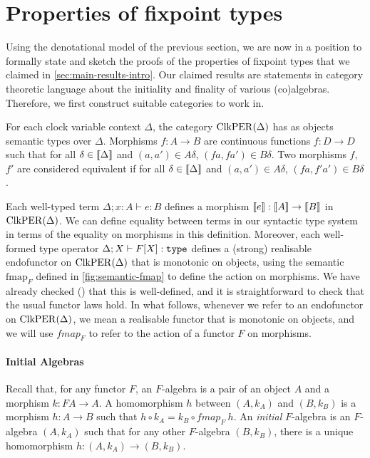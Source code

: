 \section{Properties of fixpoint types}
\label{sec:fixpoint-types}

Using the denotational model of the previous section, we are now in a
position to formally state and sketch the proofs of the properties of
fixpoint types that we claimed in
\autoref{sec:main-results-intro}. Our claimed results are statements
in category theoretic language about the initiality and finality of
various (co)algebras. Therefore, we first construct suitable
categories to work in.

\begin{definition}
  For each clock variable context $\Delta$, the category
  $\mathrm{ClkPER}(\Delta)$ has as objects semantic types over
  $\Delta$. Morphisms $f : A \to B$ are continuous functions $f : D
  \to D$ such that for all $\delta \in \llbracket \Delta \rrbracket$ and $(a,a') \in
  A\delta$, $(fa, fa') \in B\delta$. Two morphisms $f$,$f'$ are
  considered equivalent if for all $\delta \in \llbracket \Delta \rrbracket$ and
  $(a,a') \in A\delta$, $(fa, f'a') \in B\delta$.
\end{definition}

Each well-typed term $\Delta; x : A \vdash e : B$ defines a morphism
$\llbracket e \rrbracket : \llbracket A \rrbracket \to \llbracket B \rrbracket$ in $\mathrm{ClkPER}(\Delta)$. We can define
equality between terms in our syntactic type system in terms of the
equality on morphisms in this definition. Moreover, each well-formed
type operator $\Delta; X \vdash F[X] : \texttt{\textup{type}}$ defines a (strong)
realisable endofunctor on $\mathrm{ClkPER}(\Delta)$ that is monotonic on
objects, using the semantic $\mathrm{fmap}_F$ defined in
\autoref{fig:semantic-fmap} to define the action on morphisms. We have
already checked () that this is
well-defined, and it is straightforward to check that the usual
functor laws hold. In what follows, whenever we refer to an
endofunctor on $\mathrm{ClkPER}(\Delta)$, we mean a realisable functor that is
monotonic on objects, and we will use $\mathit{fmap}_F$ to refer to
the action of a functor $F$ on morphisms.

\paragraph{Initial Algebras} Recall that, for any functor $F$, an
$F$-algebra is a pair of an object $A$ and a morphism $k : FA \to
A$. A homomorphism $h$ between $(A,k_A)$ and
$(B,k_B)$ is a morphism $h : A \to B$ such that $h \circ k_A = k_B
\circ \mathit{fmap}_F~h$. An \emph{initial} $F$-algebra is an
$F$-algebra $(A,k_A)$ such that for any other $F$-algebra $(B,k_B)$,
there is a unique homomorphism $h : (A,k_A) \to (B,k_B)$.

